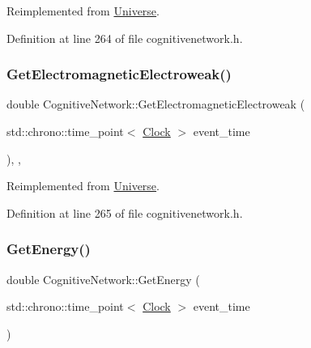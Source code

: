 Reimplemented from \hyperlink{class_universe_a63b850ef3f3394313353109d222bf5d1}{Universe}.



Definition at line 264 of file cognitivenetwork.\+h.

\mbox{\label{class_cognitive_network_a8c4e0454068f714691ae250f795cdb67}} 
\subsubsection{\texorpdfstring{Get\+Electromagnetic\+Electroweak()}{GetElectromagneticElectroweak()}}
{\footnotesize\ttfamily double Cognitive\+Network\+::\+Get\+Electromagnetic\+Electroweak (\begin{DoxyParamCaption}\item[{std\+::chrono\+::time\+\_\+point$<$ \hyperlink{universe_8h_a0ef8d951d1ca5ab3cfaf7ab4c7a6fd80}{Clock} $>$}]{event\+\_\+time }\end{DoxyParamCaption})\hspace{0.3cm}{\ttfamily [inline]}, {\ttfamily [final]}, {\ttfamily [virtual]}}



Reimplemented from \hyperlink{class_universe_a9f099605c082e7fa755787a6a8cab7ba}{Universe}.



Definition at line 265 of file cognitivenetwork.\+h.

\mbox{\label{class_cognitive_network_af23b9bce2587ccf3c8204be33fc76c61}} 
\subsubsection{\texorpdfstring{Get\+Energy()}{GetEnergy()}}
{\footnotesize\ttfamily double Cognitive\+Network\+::\+Get\+Energy (\begin{DoxyParamCaption}\item[{std\+::chrono\+::time\+\_\+point$<$ \hyperlink{universe_8h_a0ef8d951d1ca5ab3cfaf7ab4c7a6fd80}{Clock} $>$}]{event\+\_\+time }\end{DoxyParamCaption})\hspace{0.3cm}{\ttfamily [inline]}}



